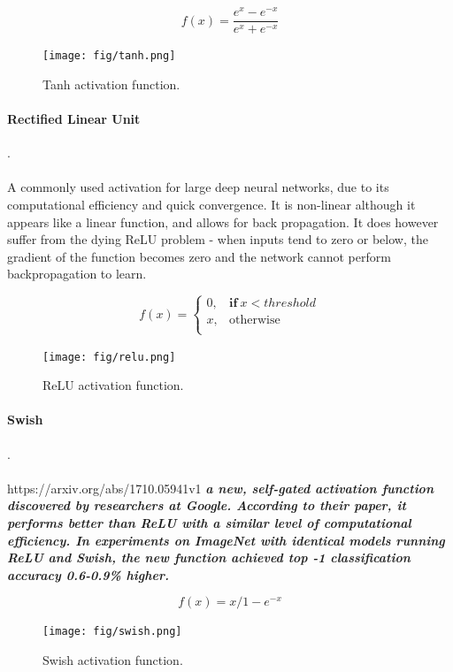 \documentclass{pasa}%
\begin{document}
\begin{equation}
    f(x) = \frac {e^x - e^{-x}} {e^x + e^{-x}}
\end{equation}
\begin{figure}[H]
\centering
\texttt{[image: fig/tanh.png]}
\caption{Tanh activation function.}
\end{figure}


\paragraph{Rectified Linear Unit}.\\\\
A commonly used activation for large deep neural networks, due to its computational efficiency and quick convergence. It is non-linear although it appears like a linear function, and allows for back propagation. It does however suffer from the dying ReLU problem - when inputs tend to zero or below, the gradient of the function becomes zero and the network cannot perform backpropagation to learn. 

\begin{equation}
f(x) = 
    \begin{cases}
      0 , & \mathbf{if} \ x < threshold \\
      x , & \text{otherwise}\\
    \end{cases}
  \end{equation}
\begin{figure}[H]
\centering
\texttt{[image: fig/relu.png]}
\caption{ReLU activation function.}
\end{figure}



\paragraph{Swish}.\\\\
https://arxiv.org/abs/1710.05941v1
\textbf{\textit{a new, self-gated activation function discovered by researchers at Google. According to their paper, it performs better than ReLU with a similar level of computational efficiency. In experiments on ImageNet with identical models running ReLU and Swish, the new function achieved top -1 classification accuracy 0.6-0.9\% higher.}}

\begin{equation}
f(x) = x/1-e^{-x}
  \end{equation}
\begin{figure}[H]
\centering
\texttt{[image: fig/swish.png]}
\caption{Swish activation function.}
\end{figure}
\end{document}
